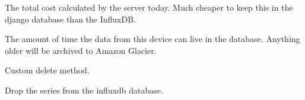 \documentclass[letterpaper,10pt,english]{sphinxmanual}
\begin{document}
\begin{fulllineitems}
\begin{fulllineitems}
\end{fulllineitems}


\begin{fulllineitems}
\label{modules/microdata:microdata.models.Device.cost_daily}
The total cost calculated by the server today. Much cheaper to keep this in the django database than the InfluxDB.

\end{fulllineitems}


\begin{fulllineitems}
\label{modules/microdata:microdata.models.Device.data_retention_policy}
The amount of time the data from this device can live in the database. Anything older will be archived to Amazon Glacier.

\end{fulllineitems}


\begin{fulllineitems}
\label{modules/microdata:microdata.models.Device.delete}
Custom delete method.

Drop the series from the influxdb database.

\end{fulllineitems}


\begin{fulllineitems}
\label{modules/microdata:microdata.models.Device.devicesettings}
\end{fulllineitems}


\begin{fulllineitems}
\label{modules/microdata:microdata.models.Device.devicewebsettings}
\end{fulllineitems}


\end{fulllineitems}
\end{document}
